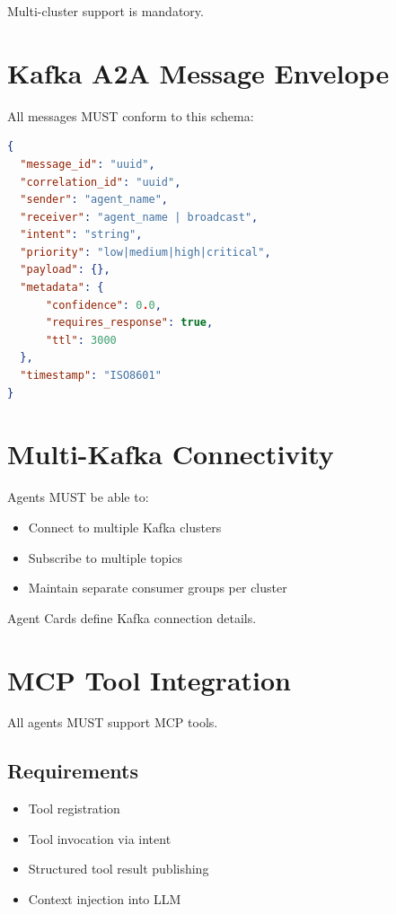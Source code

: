 \documentclass[12pt]{article}
\begin{document}
Multi-cluster support is mandatory.

\section{Kafka A2A Message Envelope}

All messages MUST conform to this schema:

\begin{lstlisting}[language=json]
{
  "message_id": "uuid",
  "correlation_id": "uuid",
  "sender": "agent_name",
  "receiver": "agent_name | broadcast",
  "intent": "string",
  "priority": "low|medium|high|critical",
  "payload": {},
  "metadata": {
      "confidence": 0.0,
      "requires_response": true,
      "ttl": 3000
  },
  "timestamp": "ISO8601"
}
\end{lstlisting}

\section{Multi-Kafka Connectivity}

Agents MUST be able to:

\begin{itemize}
    \item Connect to multiple Kafka clusters
    \item Subscribe to multiple topics
    \item Maintain separate consumer groups per cluster
\end{itemize}

Agent Cards define Kafka connection details.

\section{MCP Tool Integration}

All agents MUST support MCP tools.

\subsection{Requirements}

\begin{itemize}
    \item Tool registration
    \item Tool invocation via intent
    \item Structured tool result publishing
    \item Context injection into LLM
\end{itemize}
\end{document}
